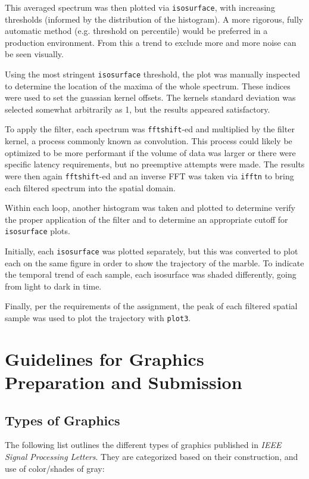 \documentclass[journal]{IEEEtran}
\def\code#1{\texttt{#1}}
\begin{document}

This averaged spectrum was then plotted via \code{isosurface}, with increasing thresholds (informed by the distribution of the histogram). A more rigorous, fully automatic method (e.g. threshold on percentile) would be preferred in a production environment. From this a trend to exclude more and more noise can be seen visually.


Using the most stringent \code{isosurface} threshold, the plot was manually inspected to determine the location of the maxima of the whole spectrum. These indices were used to set the guassian kernel offsets. The kernels standard deviation was selected somewhat arbitrarily as 1, but the results appeared satisfactory.

To apply the filter, each spectrum was \code{fftshift}-ed and multiplied by the filter kernel, a process commonly known as convolution. This process could likely be optimized to be more performant if the volume of data was larger or there were specific latency requirements, but no preemptive attempts were made. The results were then again \code{fftshift}-ed and an inverse FFT was taken via \code{ifftn} to bring each filtered spectrum into the spatial domain.

Within each loop, another histogram was taken and plotted to determine verify the proper application of the filter and to determine an appropriate cutoff for \code{isosurface} plots.


Initially, each \code{isosurface} was plotted separately, but this was converted to plot each on the same figure in order to show the trajectory of the marble. To indicate the temporal trend of each sample, each isosurface was shaded differently, going from light to dark in time.


Finally, per the requirements of the assignment, the peak of each filtered spatial sample was used to plot the trajectory with \code{plot3}.



\section{Guidelines for Graphics Preparation and Submission}
\label{sec:guidelines}

\subsection{Types of Graphics}
The following list outlines the different types of graphics published in 
{\it IEEE Signal Processing Letters}. They are categorized based on their construction, and use of 
color/shades of gray:
\end{document}
